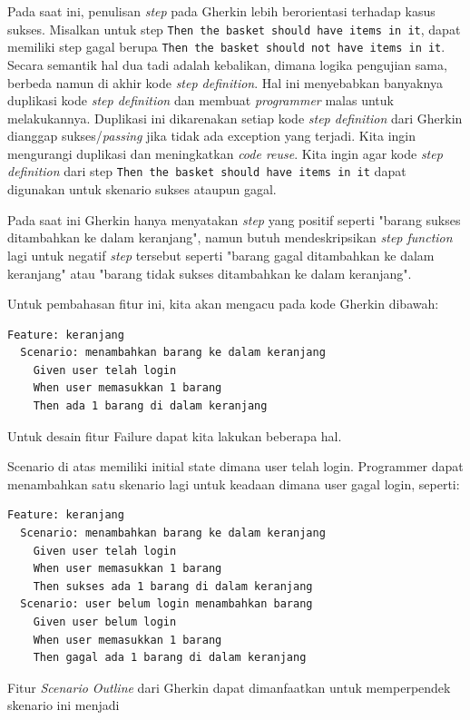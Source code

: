 Pada saat ini, penulisan \emph{step} pada Gherkin lebih berorientasi terhadap
kasus sukses. Misalkan untuk step \texttt{Then the basket should have items in it},
dapat memiliki step gagal berupa \texttt{Then the basket should not have items in it}.
Secara semantik hal dua tadi adalah kebalikan, dimana logika pengujian
sama, berbeda namun di akhir kode \emph{step definition}. Hal ini
menyebabkan banyaknya duplikasi kode \emph{step definition} dan membuat \emph{programmer} malas untuk
melakukannya.
Duplikasi ini dikarenakan setiap kode \emph{step definition} dari Gherkin dianggap
sukses/\emph{passing} jika tidak ada exception yang terjadi.
Kita ingin mengurangi duplikasi dan meningkatkan \emph{code reuse}.
Kita ingin agar kode \emph{step definition} dari step \texttt{Then the basket should have items in it}
dapat digunakan untuk skenario sukses ataupun gagal.

Pada saat ini Gherkin hanya menyatakan \textit{step} yang positif seperti
"barang sukses ditambahkan ke dalam keranjang", namun butuh mendeskripsikan \textit{step function}
lagi untuk negatif \textit{step} tersebut seperti "barang gagal ditambahkan ke dalam keranjang" atau
"barang tidak sukses ditambahkan ke dalam keranjang".

Untuk pembahasan fitur ini, kita akan mengacu pada kode Gherkin dibawah:
\begin{lstlisting}[language=gherkin]
Feature: keranjang
  Scenario: menambahkan barang ke dalam keranjang
    Given user telah login
    When user memasukkan 1 barang
    Then ada 1 barang di dalam keranjang
\end{lstlisting}

Untuk desain fitur Failure dapat kita lakukan beberapa hal.

Scenario di atas memiliki initial state dimana user telah login.
Programmer dapat menambahkan satu skenario lagi untuk keadaan dimana user gagal login, seperti:
\begin{lstlisting}[language=gherkin]
Feature: keranjang
  Scenario: menambahkan barang ke dalam keranjang
    Given user telah login
    When user memasukkan 1 barang
    Then sukses ada 1 barang di dalam keranjang
  Scenario: user belum login menambahkan barang 
    Given user belum login
    When user memasukkan 1 barang
    Then gagal ada 1 barang di dalam keranjang
\end{lstlisting}

Fitur \textit{Scenario Outline} dari Gherkin dapat dimanfaatkan untuk memperpendek skenario ini menjadi

